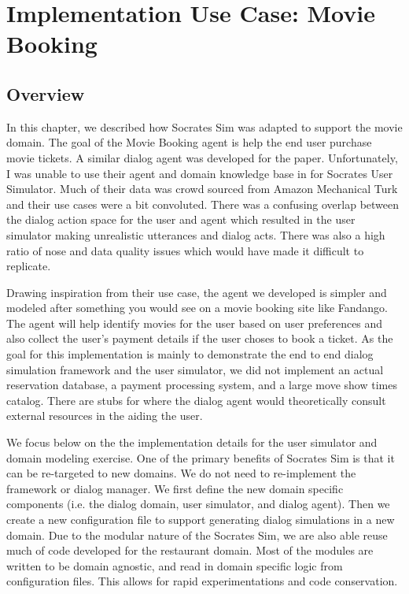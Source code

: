\chapter{Implementation Use Case:  Movie Booking}
\label{chap:movie}

\section{Overview}
In this chapter, we described how Socrates Sim was adapted to support the movie domain. The goal of the Movie Booking agent is help the end user purchase movie tickets. A similar dialog agent was developed for the \cite{li_usersim} paper. Unfortunately, I was unable to use their agent and domain knowledge base in for Socrates User Simulator. Much of their data was crowd sourced from Amazon Mechanical Turk and their use cases were a bit convoluted. There was a confusing overlap between the dialog action space for the user and agent which resulted in the user simulator making unrealistic utterances and dialog acts. There was also a high ratio of nose and data quality issues which would have made it difficult to replicate.  

Drawing inspiration from their use case, the agent we developed is simpler and modeled after something you would see on a movie booking site like Fandango. The agent will help identify movies for the user based on user preferences and also collect the user's payment details if the user choses to book a ticket. As the goal for this implementation is mainly to demonstrate the end to end dialog simulation framework and the user simulator, we did not implement an actual reservation database, a payment processing system, and a large move show times catalog. There are stubs for where the dialog agent would theoretically consult external resources in the aiding the user. 

We focus below on the the implementation details for the user simulator and domain modeling exercise. One of the primary benefits of Socrates Sim is that it can be re-targeted to new domains. We do not need to re-implement the framework or dialog manager. We first define the new domain specific components (i.e. the dialog domain, user simulator, and dialog agent). Then we create a new configuration file to support generating dialog simulations in a new domain. Due to the modular nature of the Socrates Sim, we are also able reuse much of code developed for the restaurant domain. Most of the modules are written to be domain agnostic, and read in domain specific logic from configuration files. This allows for rapid experimentations and code conservation.

